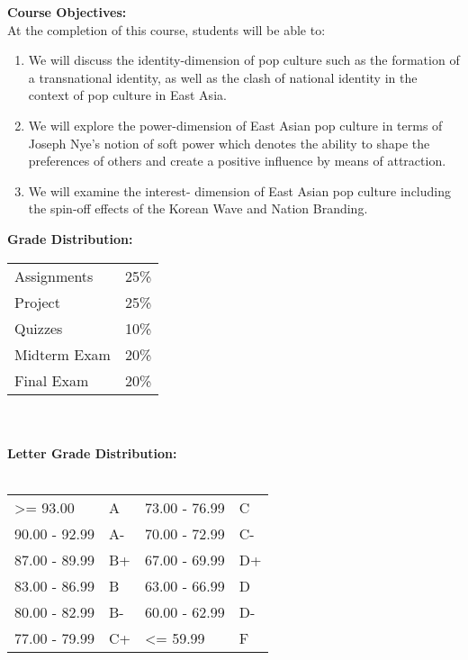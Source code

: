 \documentclass[11pt]{article}
\begin{document}
\textbf {\large Course Objectives:} \\
At the completion of this course, students will be able to:
\begin{enumerate} \itemsep-0.4em
  \item We will discuss the identity-dimension of pop culture such as the formation of a transnational identity, as well as the clash of national identity in the context of pop culture in East Asia.
  \item We will explore the power-dimension of East Asian pop culture in terms of Joseph Nye’s notion of soft power which denotes the ability to shape the preferences of others and create a positive influence by means of attraction.
  \item We will examine the interest- dimension of East Asian pop culture including the spin-off effects of the Korean Wave and Nation Branding.

\end{enumerate}

\textbf {\large Grade Distribution:} \\
\hspace*{40mm}
\begin{tabular}{ l l }

Assignments & 25\% \\
Project & 25\% \\
Quizzes  & 10\% \\
Midterm Exam  & 20\% \\
Final Exam  & 20\%
\end{tabular} \\\\

\textbf {\large Letter Grade Distribution:} \\\\
\hspace*{40mm}
\begin{tabular}{ l l | l l }
\textgreater= 93.00 & A & 73.00 - 76.99 & C \\
90.00 - 92.99 & A-  & 70.00 - 72.99 & C- \\
87.00 - 89.99 & B+  & 67.00 - 69.99 & D+ \\
83.00 - 86.99 & B  & 63.00 - 66.99 & D \\
80.00 - 82.99 & B-  & 60.00 - 62.99 & D- \\
77.00 - 79.99 & C+  & \textless= 59.99 & F \\
\end{tabular} \\
\end{document}
